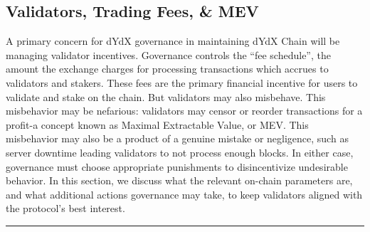 \begin{fullwidth}
    \section{Validators, Trading Fees, \& MEV} \label{sec:validators}

    \begin{adjustwidth}{2cm}{2cm}
        \justify
        A primary concern for dYdX governance in maintaining dYdX Chain will be managing validator incentives. Governance controls the ``fee schedule'', the amount the exchange charges for processing transactions which accrues to validators and stakers. These fees are the primary financial incentive for users to validate and stake on the chain. But validators may also misbehave. This misbehavior may be nefarious: validators may censor or reorder transactions for a profit-a concept known as Maximal Extractable Value, or MEV. This misbehavior may also be a product of a genuine mistake or negligence, such as server downtime leading validators to not process enough blocks. In either case, governance must choose appropriate punishments to disincentivize undesirable behavior. In this section, we discuss what the relevant on-chain parameters are, and what additional actions governance may take, to keep validators aligned with the protocol's best interest.
    \end{adjustwidth}
    
    \textcolor{gray}{\rule{\linewidth}{0.1mm}}
    
\end{fullwidth}

